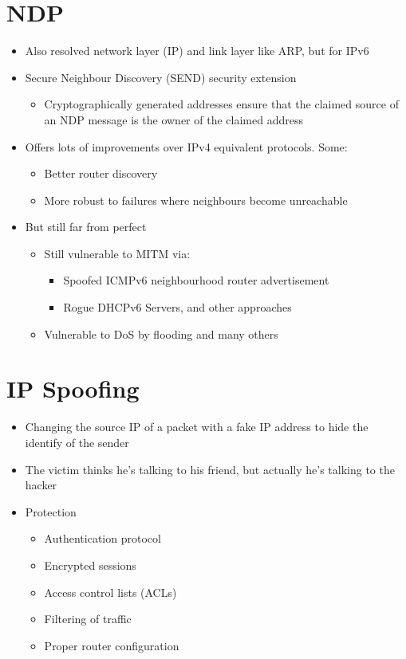 \documentclass{article}[18pt]
\begin{document}
\section{NDP}
\begin{itemize}
	\item Also resolved network layer (IP) and link layer like ARP, but for IPv6
	\item Secure Neighbour Discovery (SEND) security extension
	\begin{itemize}
		\item Cryptographically generated addresses ensure that the claimed source of an NDP message is the owner of the claimed address
	\end{itemize}
	\item Offers lots of improvements over IPv4 equivalent protocols. Some:
	\begin{itemize}
		\item Better router discovery
		\item More robust to failures where neighbours become unreachable
	\end{itemize}
	\item But still far from perfect
	\begin{itemize}
		\item Still vulnerable to MITM via:
		\begin{itemize}
			\item Spoofed ICMPv6 neighbourhood router advertisement
			\item Rogue DHCPv6 Servers, and other approaches
		\end{itemize}
		\item Vulnerable to DoS by flooding and many others
	\end{itemize}
\end{itemize}
\section{IP Spoofing}
\begin{itemize}
	\item Changing the source IP of a packet with a fake IP address to hide the identify of the sender
	\item The victim thinks he's talking to his friend, but actually he's talking to the hacker
	\item Protection
	\begin{itemize}
		\item Authentication protocol
		\item Encrypted sessions
		\item Access control lists (ACLs)
		\item Filtering of traffic
		\item Proper router configuration
	\end{itemize}
\end{itemize}
\end{document}
